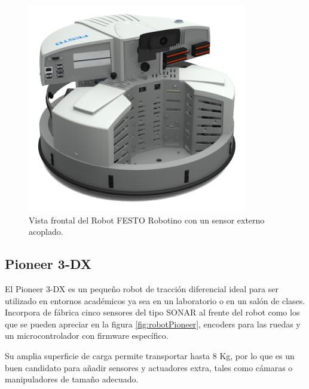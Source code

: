 \begin{figure}[ht]
	\centering
	\includegraphics[scale=1.5]{./Figures/robotino.png}
	\caption{Vista frontal del Robot FESTO Robotino con un sensor externo acoplado\protect\footnotemark.}
	\label{fig:robotRobotino}
\end{figure}



\subsection{Pioneer 3-DX}

El Pioneer 3-DX es un pequeño robot de tracción diferencial ideal para ser utilizado en entornos académicos ya sea en un laboratorio o en un salón de clases. Incorpora de fábrica cinco sensores del tipo SONAR al frente del robot como los que se pueden apreciar en la figura \ref{fig:robotPioneer}, encoders para las ruedas y un microcontrolador con firmware específico.

Su amplia superficie de carga permite transportar hasta 8 Kg, por lo que es un buen candidato para añadir sensores y actuadores extra, tales como cámaras o manipuladores de tamaño adecuado.

